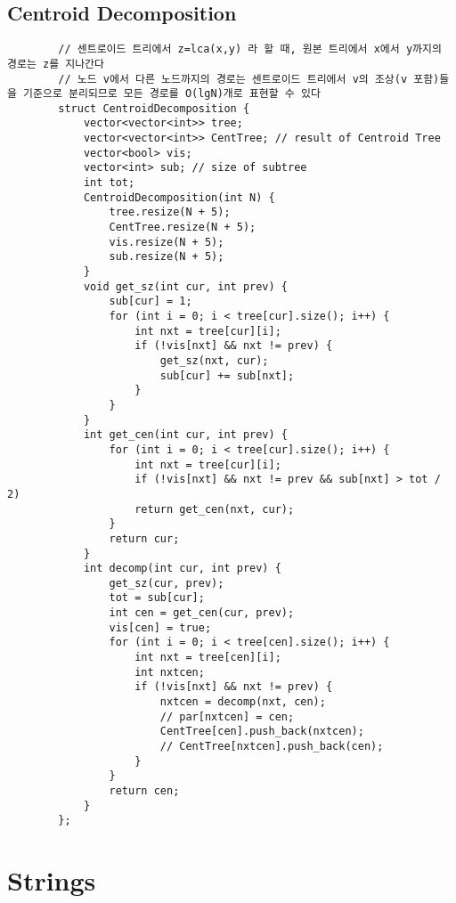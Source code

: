 \documentclass[landscape, 8pt, a4paper, oneside, twocolumn]{extarticle}
\begin{document}
	\subsection {Centroid Decomposition}
	\begin{verbatim}
		// 센트로이드 트리에서 z=lca(x,y) 라 할 때, 원본 트리에서 x에서 y까지의 경로는 z를 지나간다
		// 노드 v에서 다른 노드까지의 경로는 센트로이드 트리에서 v의 조상(v 포함)들을 기준으로 분리되므로 모든 경로를 O(lgN)개로 표현할 수 있다
		struct CentroidDecomposition {
			vector<vector<int>> tree;
			vector<vector<int>> CentTree; // result of Centroid Tree
			vector<bool> vis;
			vector<int> sub; // size of subtree
			int tot;
			CentroidDecomposition(int N) {
				tree.resize(N + 5);
				CentTree.resize(N + 5);
				vis.resize(N + 5);
				sub.resize(N + 5);
			}
			void get_sz(int cur, int prev) {
				sub[cur] = 1;
				for (int i = 0; i < tree[cur].size(); i++) {
					int nxt = tree[cur][i];
					if (!vis[nxt] && nxt != prev) {
						get_sz(nxt, cur);
						sub[cur] += sub[nxt];
					}
				}
			}
			int get_cen(int cur, int prev) {
				for (int i = 0; i < tree[cur].size(); i++) {
					int nxt = tree[cur][i];
					if (!vis[nxt] && nxt != prev && sub[nxt] > tot / 2)
					return get_cen(nxt, cur);
				}
				return cur;
			}
			int decomp(int cur, int prev) {
				get_sz(cur, prev);
				tot = sub[cur];
				int cen = get_cen(cur, prev);
				vis[cen] = true;
				for (int i = 0; i < tree[cen].size(); i++) {
					int nxt = tree[cen][i];
					int nxtcen;
					if (!vis[nxt] && nxt != prev) {
						nxtcen = decomp(nxt, cen);
						// par[nxtcen] = cen;
						CentTree[cen].push_back(nxtcen);
						// CentTree[nxtcen].push_back(cen);
					}
				}
				return cen;
			}
		};
	\end{verbatim}
	\section{Strings}
\end{document}

